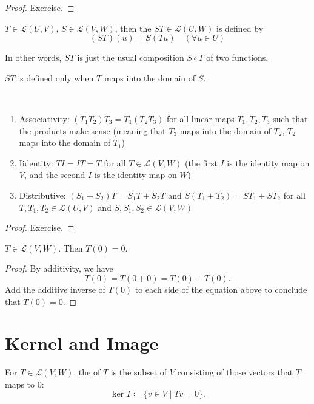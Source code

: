 \begin{proof}
Exercise.
\end{proof}

\begin{definition}
$T\in\mathcal{L}(U,V)$, $S\in\mathcal{L}(V,W)$, then the  $ST\in\mathcal{L}(U,W)$ is defined by
\[(ST)(u)=S(Tu)\quad(\forall u\in U)\]
\end{definition}

\begin{remark}
In other words, $ST$ is just the usual composition $S\circ T$ of two functions.
\end{remark}

\begin{remark}
$ST$ is defined only when $T$ maps into the domain of $S$.
\end{remark}

\begin{proposition} \
\begin{enumerate}[label=(\roman*)]
\item Associativity: $(T_1T_2)T_3=T_1(T_2T_3)$ for all linear maps $T_1,T_2,T_3$ such that the products make sense (meaning that $T_3$ maps into the domain of $T_2$, $T_2$ maps into the domain of $T_1$)
\item Iidentity: $TI=IT=T$ for all $T\in\mathcal{L}(V,W)$ (the first $I$ is the identity map on $V$, and the second $I$ is the identity map on $W$)
\item Distributive: $(S_1+S_2)T=S_1T+S_2T$ and $S(T_1+T_2)=ST_1+ST_2$ for all $T,T_1,T_2\in\mathcal{L}(U,V)$ and $S,S_1,S_2\in\mathcal{L}(V,W)$
\end{enumerate}
\end{proposition}

\begin{proof}
Exercise.
\end{proof}

\begin{proposition}\label{prop:linear-map-0-0}
$T\in\mathcal{L}(V,W)$. Then $T(0)=0$.
\end{proposition}

\begin{proof}
By additivity, we have
\[T(0)=T(0+0)=T(0)+T(0).\]
Add the additive inverse of $T(0)$ to each side of the equation above to conclude that $T(0)=0$.
\end{proof}

\section{Kernel and Image}
\begin{definition}[Kernel]
For $T\in\mathcal{L}(V,W)$, the  of $T$ is the subset of $V$ consisting of those vectors that $T$ maps to $0$:
\[\ker T\coloneqq\{v\in V\mid Tv=0\}.\]
\end{definition}

